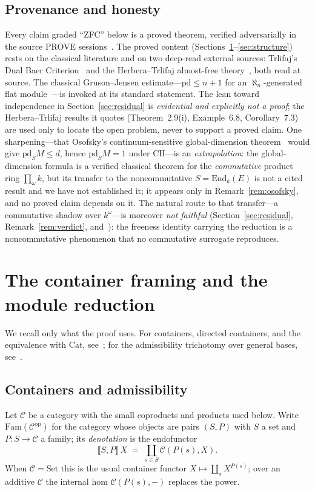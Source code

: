 \documentclass[11pt,reqno]{amsart}
\theoremstyle{plain}
\theoremstyle{definition}
\theoremstyle{remark}
\newcommand{\Set}{\mathrm{Set}}
\newcommand{\Cat}{\mathrm{Cat}}
\newcommand{\Fam}{\mathrm{Fam}}
\newcommand{\End}{\mathrm{End}}
\newcommand{\pd}{\mathrm{pd}}
\newcommand{\op}{\mathrm{op}}
\newcommand{\den}[1]{\llbracket #1 \rrbracket}
\newcommand{\C}{\mathcal{C}}
\begin{document}
\subsection*{Provenance and honesty}
Every claim graded ``ZFC'' below is a proved theorem, verified adversarially in the source PROVE sessions~\cite{macbeth-reduction,macbeth-trlifaj,macbeth-ch,macbeth-kappa,macbeth-osofsky}. The proved content (Sections~\ref{sec:prelim}--\ref{sec:structure}) rests on the classical literature and on two deep-read external sources: Trlifaj's Dual Baer Criterion~\cite{trlifaj-dbc} and the Herbera--Trlifaj almost-free theory~\cite{herbera-trlifaj}, both read at source. The classical Gruson--Jensen estimate---$\pd\le n+1$ for an $\aleph_n$-generated flat module~\cite{gruson-jensen}---is invoked at its standard statement. The lean toward independence in Section~\ref{sec:residual} is \emph{evidential and explicitly not a proof}; the Herbera--Trlifaj results it quotes (Theorem~2.9(i), Example~6.8, Corollary~7.3) are used only to locate the open problem, never to support a proved claim. One sharpening---that Osofsky's continuum-sensitive global-dimension theorem~\cite{osofsky} would give $\pd_S M\le d$, hence $\pd_S M=1$ under CH---is an \emph{extrapolation}: the global-dimension formula is a verified classical theorem for the \emph{commutative} product ring $\prod_{\omega}k$, but its transfer to the noncommutative $S=\End_k(E)$ is not a cited result and we have not established it; it appears only in Remark~\ref{rem:osofsky}, and no proved claim depends on it. The natural route to that transfer---a commutative shadow over $k^{\omega}$---is moreover \emph{not faithful} (Section~\ref{sec:residual}, Remark~\ref{rem:verdict}, and~\cite{macbeth-shadow}): the freeness identity carrying the reduction is a noncommutative phenomenon that no commutative surrogate reproduces.

\section{The container framing and the module reduction}\label{sec:prelim}

We recall only what the proof uses. For containers, directed containers, and the equivalence with $\Cat$, see~\cite{ahman-uustalu,shapiro-spivak}; for the admissibility trichotomy over general bases, see~\cite{macbeth-admissibility}.

\subsection{Containers and admissibility}
Let $\C$ be a category with the small coproducts and products used below. Write $\Fam(\C^{\op})$ for the category whose objects are pairs $(S,P)$ with $S$ a set and $P\colon S\to\C$ a family; its \emph{denotation} is the endofunctor
\[
  \den{S,P}\,X \;=\; \coprod_{s\in S}\C(P(s),X).
\]
When $\C=\Set$ this is the usual container functor $X\mapsto\coprod_{s}X^{P(s)}$; over an additive $\C$ the internal hom $\C(P(s),-)$ replaces the power.
\end{document}

